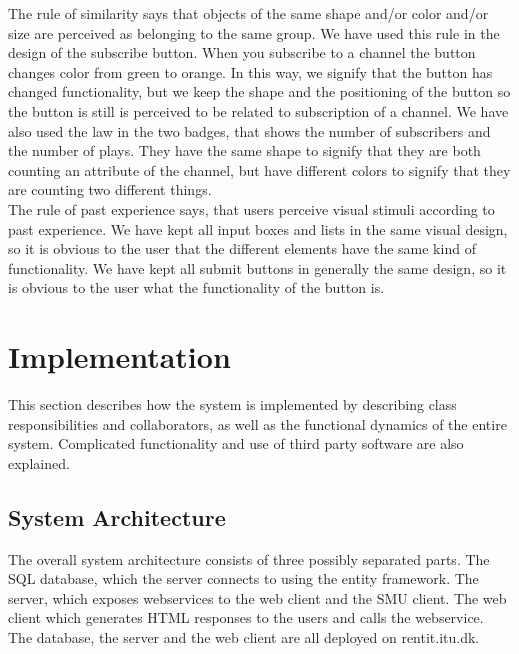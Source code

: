 \documentclass[a4paper,11pt,report]{article}
\begin{document}
The rule of similarity says that objects of the same shape and/or color and/or size are perceived as belonging to the same group. We have used this rule in the design of the subscribe button. When you subscribe to a channel the button changes color from green to orange. In this way, we signify that the button has changed functionality, but we keep the shape and the positioning of the button so the button is still is perceived to be related to subscription of a channel. We have also used the law in the two badges, that shows the number of subscribers and the number of plays. They have the same shape to signify that they are both counting an attribute of the channel, but have different colors to signify that they are counting two different things. \\

The rule of past experience says, that users perceive visual stimuli according to past experience. We have kept all input boxes and lists in the same visual design, so it is obvious to the user that the different elements have the same kind of functionality. We have kept all submit buttons in generally the same design, so it is obvious to the user what the functionality of the button is. \\ 
\newpage
\section{Implementation}
This section describes how the system is implemented by describing class responsibilities and collaborators, as well as the functional dynamics of the entire system. Complicated functionality and use of third party software are also explained.

\subsection{System Architecture}
The overall system architecture consists of three possibly separated parts. The SQL database, which the server connects to using the entity framework. The server, which exposes webservices to the web client and the SMU client. The web client which generates HTML responses to the users and calls the webservice. The database, the server and the web client are all deployed on rentit.itu.dk.
\end{document}
